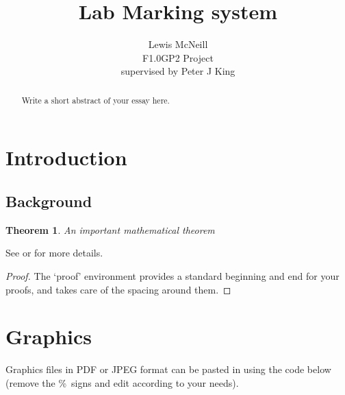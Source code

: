 \documentclass[12pt]{article}  %
\title{Lab Marking system}
\author{Lewis McNeill\\
F1.0GP2 Project\\
supervised by
Peter J King}
\newtheorem{theorem}{Theorem}[section]          %
\theoremstyle{definition}
\theoremstyle{remark}
\begin{document}
\maketitle

\newpage                     %
\begin{abstract}

Write a short abstract of your essay here.



\end{abstract}

\newpage                     %
\tableofcontents

\newpage                     %
\section{Introduction}\label{s:intro}
%

\subsection{Background}\label{ss:back}

\begin{theorem}\label{th:important}
 An important mathematical theorem
\end{theorem}

See \cite[Chapter 3]{Cassels} or \cite{Bovey} for more details.

\begin{proof}
The `proof' environment provides a standard beginning and end for your proofs,
and takes care of the spacing around them.
\end{proof}

\section{Graphics}

Graphics files in PDF or JPEG format can be pasted in using the code
below (remove the \%\ signs and edit according to your needs).

%
%
%
%
%
\end{document}
